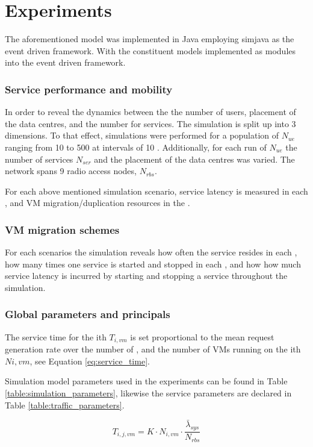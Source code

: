 \section{Experiments}
The aforementioned model was implemented in Java employing simjava \cite{SimJava} as the event driven framework. With the constituent models implemented as modules into the event driven framework.

\subsubsection{Service performance and mobility}

In order to reveal the dynamics between the the number of users, placement of the data centres, and the number for services. The simulation is split up into 3 dimensions. To that effect, simulations were performed for a population of \ues{} $N_{ue}$ ranging from 10 to 500 \ues{} at intervals of 10 \ues{}. Additionally, for each run of $N_{ue}$ the number of services $N_{ser}$ and the placement of the data centres was varied. The network spans 9 radio access nodes, $N_{rbs}$.

For each above mentioned simulation scenario, service latency is measured in each \ue{}, and VM migration/duplication resources in the \dc{}.

\subsubsection{VM migration schemes}
For each scenarios the simulation reveals how often the service resides in each \dc{}, how many times one service is started and stopped in each \dc{}, and how how much service latency is incurred by starting and stopping a service throughout the simulation.

\subsubsection{Global parameters and principals}
The \dc{} service time for the ith \dc{} $T_{i,vm}$ is set proportional to the mean request generation rate over the number of \rbss{}, and the number of VMs running on the ith \dc{} $N{i,vm}$, see Equation \ref{eq:service_time}.

Simulation model parameters used in the experiments can be found in Table \ref{table:simulation_parameters}, likewise the service parameters are declared in Table \ref{table:traffic_parameters}.

\begin{equation}
\label{eq:service_time}
T_{i,j,vm} = K \cdot N_{i,vm} \cdot \frac{ \bar{\lambda}_{sys} }{N_{rbs}}
\end{equation}

